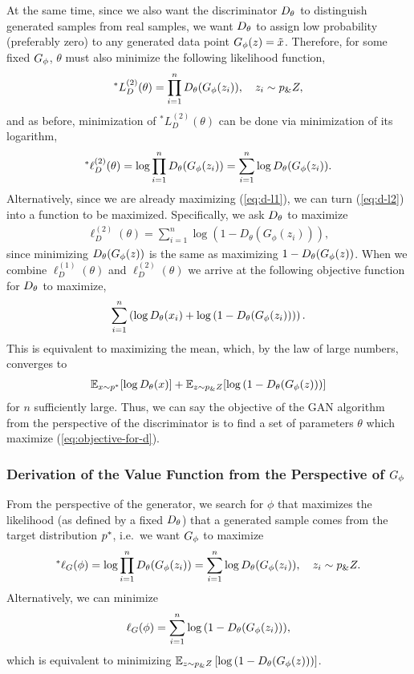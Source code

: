 At the same time, since we also want the discriminator $D_\theta$ to
distinguish generated samples from real samples, we want $D_\theta$ to
assign low probability (preferably zero) to any generated data point
$G_\phi(z) = \tilde{x}$.  Therefore, for some fixed $G_\phi$, $\theta$
must also minimize the following likelihood function,
\begin{align}
  ^*L_{D}^{(2)}(\theta) = \prod_{i=1}^n D_\theta(G_\phi(z_i)), \quad z_i \sim p_\&Z,
\end{align}
and as before, minimization of $^*L_{D}^{(2)}(\theta)$ can be done via
minimization of its logarithm,
\begin{align}
  \label{eq:d-l2} ^*\ell_{D}^{(2)}(\theta) = \log \prod_{i=1}^n D_\theta(G_\phi(z_i)) = \sum_{i=1}^n \log D_\theta (G_\phi(z_i)).
\end{align}
Alternatively, since we are already maximizing (\ref{eq:d-l1}), we can
turn (\ref{eq:d-l2}) into a function to be maximized. Specifically, we
ask $D_\theta$ to maximize
\begin{align}
  \ell_{D}^{(2)}(\theta) = \sum_{i=1}^n \log{(1 - D_\theta(G_\phi(z_i)))},
\end{align}
since minimizing $D_\theta(G_\phi(z))$ is the same as maximizing
$1 - D_\theta(G_\phi(z))$. When we combine $\ell_{D}^{(1)}(\theta)$ and
$\ell_{D}^{(2)}(\theta)$ we arrive at the following objective function
for $D_\theta$ to maximize,
\begin{align}
  \sum_{i=1}^n \left( \log D_\theta(x_i) + \log{(1 - D_\theta(G_\phi(z_i)))} \right).
\end{align}
This is equivalent to maximizing the mean, which, by the law of large
numbers, converges to
\begin{align}
  \label{eq:objective-for-d}
  \mathbb{E}_{x \sim p^*}[{\log D_\theta(x})] + \mathbb{E}_{z \sim p_\&Z}[\log{(1 - D_\theta(G_\phi(z)))}]
\end{align}
for $n$ sufficiently large. Thus, we can say the objective of the GAN algorithm
from the perspective of the discriminator is to find a set of parameters
$\theta$ which maximize (\ref{eq:objective-for-d}).

\subsubsection{Derivation of the Value Function from the Perspective of $G_\phi$}%
\label{sec:derivation-g}

From the perspective of the generator, we search for $\phi$ that maximizes the
likelihood (as defined by a fixed $D_\theta$) that a generated sample comes from the
target distribution $p^*$, i.e.\ we want $G_\phi$ to maximize
\begin{align}
  ^*\ell_G(\phi) = \log\prod_{i=1}^nD_\theta(G_\phi(z_i)) = \sum_{i=1}^n\log{D_\theta(G_\phi(z_i))}, \quad z_i \sim p_\&Z.
\end{align}
Alternatively, we can minimize
\begin{align}
  \ell_G(\phi) = \sum_{i=1}^n\log{(1 - D_\theta(G_\phi(z_i)))},
\end{align}
which is equivalent to minimizing $\mathbb{E}_{z \sim p_\&Z} \left[\log{(1 - D_\theta(G_\phi(z)))} \right]$.

